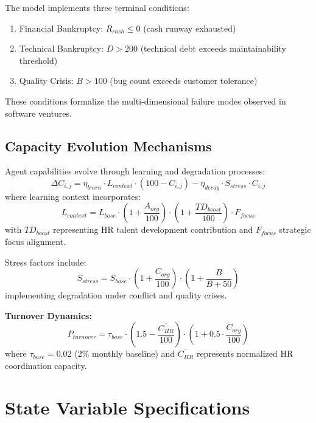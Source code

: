 \documentclass[alpha-refs]{wiley-article}
\begin{document}
The model implements three terminal conditions:
\begin{enumerate}
\item Financial Bankruptcy: $R_{cash} \leq 0$ (cash runway exhausted)
\item Technical Bankruptcy: $D > 200$ (technical debt exceeds maintainability threshold)
\item Quality Crisis: $B > 100$ (bug count exceeds customer tolerance)
\end{enumerate}
These conditions formalize the multi-dimensional failure modes observed in software ventures.

\subsection{Capacity Evolution Mechanisms}

Agent capabilities evolve through learning and degradation processes:
\begin{equation}
\Delta C_{i,j} = \eta_{learn} \cdot L_{context} \cdot (100 - C_{i,j}) - \eta_{decay} \cdot S_{stress} \cdot C_{i,j}
\end{equation}
where learning context incorporates:
\begin{equation}
L_{context} = L_{base} \cdot \left(1 + \frac{A_{org}}{100}\right) \cdot \left(1 + \frac{TD_{boost}}{100}\right) \cdot F_{focus}
\end{equation}
with $TD_{boost}$ representing HR talent development contribution and $F_{focus}$ strategic focus alignment.

Stress factors include:
\begin{equation}
S_{stress} = S_{base} \cdot \left(1 + \frac{C_{org}}{100}\right) \cdot \left(1 + \frac{B}{B + 50}\right)
\end{equation}
implementing degradation under conflict and quality crises.

\textbf{Turnover Dynamics:}
\begin{equation}
P_{turnover} = \tau_{base} \cdot \left(1.5 - \frac{\overline{C_{HR}}}{100}\right) \cdot \left(1 + 0.5 \cdot \frac{C_{org}}{100}\right)
\end{equation}
where $\tau_{base} = 0.02$ (2\% monthly baseline) and $\overline{C_{HR}}$ represents normalized HR coordination capacity.

\section{State Variable Specifications}
\label{app:stockflow}
\end{document}
